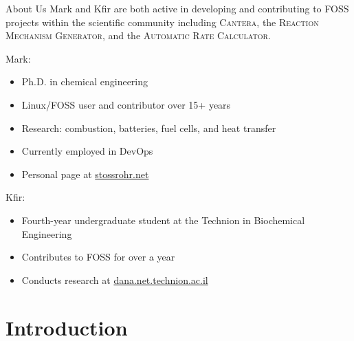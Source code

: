 \begin{frame}{About Us}
Mark and Kfir are both active in developing and contributing to FOSS projects within the scientific community including \textsc{Cantera}, the \textsc{Reaction Mechanism Generator}, and the \textsc{Automatic Rate Calculator}.

\vspace{10pt}

Mark:
\begin{itemize}
 \item Ph.D. in chemical engineering
 \item Linux/FOSS user and contributor over 15+ years
 \item Research: combustion, batteries, fuel cells, and heat transfer
 \item Currently employed in DevOps
 \item Personal page at \url{stossrohr.net}
\end{itemize}

\vspace{10pt}

Kfir:
\begin{itemize}
 \item Fourth-year undergraduate student at the Technion in Biochemical Engineering
 \item Contributes to FOSS for over a year
 \item Conducts research at \url{dana.net.technion.ac.il}
\end{itemize}

\end{frame}

\section{Introduction}



